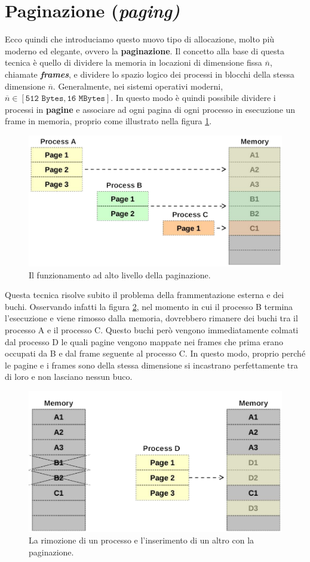 \section{Paginazione (\textit{paging)}}\label{paginazione}
Ecco quindi che introduciamo questo nuovo tipo di allocazione, molto più moderno ed elegante, ovvero la \textbf{paginazione}. Il concetto alla base di questa tecnica è quello di dividere la memoria in locazioni di dimensione fissa $\overline{n}$, chiamate \textbf{\textit{frames}}, e dividere lo spazio logico dei processi in blocchi della stessa dimensione $\overline{n}$. Generalmente, nei sistemi operativi moderni, $\overline{n}\in [ \texttt{512 Bytes},\texttt{16 MBytes} ]$. In questo modo è quindi possibile dividere i processi in \textbf{pagine} e associare ad ogni pagina di ogni processo in esecuzione un frame in memoria, proprio come illustrato nella figura \ref{fig:paging}.
\begin{figure}[h]
    \centering
    \includegraphics[width = .6\textwidth]{../res/imgs/main memory/paging.png}
    \caption{Il funzionamento ad alto livello della paginazione.}
    \label{fig:paging}
\end{figure}
Questa tecnica risolve subito il problema della frammentazione esterna e dei buchi. Osservando infatti la figura \ref{fig:remove_process_paging}, nel momento in cui il processo B termina l'esecuzione e viene rimosso dalla memoria, dovrebbero rimanere dei buchi tra il processo A e il processo C. Questo buchi però vengono immediatamente colmati dal processo D le quali pagine vengono mappate nei frames che prima erano occupati da B e dal frame seguente al processo C. In questo modo, proprio perché le pagine e i frames sono della stessa dimensione si incastrano perfettamente tra di loro e non lasciano nessun buco.
\begin{figure}[h]
    \centering
    \includegraphics[width = .6\textwidth]{../res/imgs/main memory/remove_process_paging.png}
    \caption{La rimozione di un processo e l'inserimento di un altro con la paginazione.}
    \label{fig:remove_process_paging}
\end{figure}

